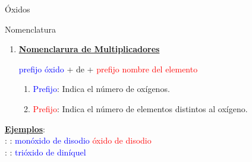 \documentclass{beamer}
\newcommand*{\numberballmDarkTeal}{\protect\cnumero{\arabic*}{mDarkTeal}}
\newcommand{\nline}[1][6pt]{\\[#1]}
\begin{document}
\begin{frame}[t]{Óxidos}
    \begin{alertblock}{\Large Nomenclatura}
        \vspace*{2mm}
        \begin{enumerate}[label=\numberballmDarkTeal]
            \item \textbf{\uline{Nomenclarura de Multiplicadores}}
                  \begin{center}
                      \textcolor{blue}{prefijo} \textcolor{blue}{óxido} + de + \textcolor{red}{prefijo} \textcolor{red}{nombre del elemento}
                  \end{center}

                  \begin{enumerate}[label=\textcolor{red}{$\bullet$}]
                      \item \textcolor{blue}{Prefijo}: Indica el número de oxígenos.
                      \item \textcolor{red}{Prefijo}: Indica el número de elementos distintos al oxígeno.
                  \end{enumerate}
        \end{enumerate}
        \textbf{\uline{Ejemplos}}:\nline

         : : \textcolor{blue}{monóxido de disodio} \ch{->} \textcolor{red}{óxido de disodio}\nline

         : : \textcolor{blue}{trióxido de diníquel}
    \end{alertblock}
\end{frame}
\end{document}
